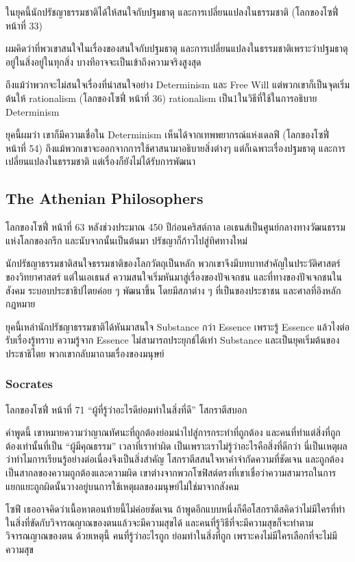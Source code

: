 ในยุคนี้นักปรัชญาธรรมชาติได้ให้สนใจกับปฐมธาตุ และการเปลี่ยนแปลงในธรรมชาติ (โลกของโซฟี่ หน้าที่ 33)

ผมคิดว่าที่พวเขาสนใจในเรื่องของสนใจกับปฐมธาตุ และการเปลี่ยนแปลงในธรรมชาติเพราะว่าปฐมธาตุอยู่ในสิ่งอยู่ในทุกสิ่ง บางทีอาจจะเป็นเข้าถึงความจริงสูงสุด

ถึงแม้ว่าพวกจะไม่สนใจเรื่องที่น่าสนใจอย่าง Determinism และ Free Will แต่พวกเขาก็เป็นจุดเริ่มต้นให้ rationalism (โลกของโซฟี่ หน้าที่ 36)
rationalism เป็น1ในวิธีที่ใช้ในการอธิบาย Determinism

ยุคนี้ผมว่า เขาก็มีความเชื่อใน Determinism เห็นได้จากเทพพยากรณ์แห่งเดลฟี (โลกของโซฟี่ หน้าที่ 54) ถึงแม้พวกเขาจะออกจากการใช้ศาสนามาอธิบายสิ่งต่างๆ
แต่ก็เฉพาะเรื่องปฐมธาตุ และการเปลี่ยนแปลงในธรรมชาติ แต่เรื่องก็ยังไม่ได้รับการพัฒนา

\subsection{The Athenian Philosophers}

\begin{bookquote}{โลกของโซฟี่ หน้าที่ 63}
หลังช่วงประมาณ 450 ปีก่อนคริสต์กาล เอเธนส์เป็นศูนย์กลางทางวัฒนธรรมแห่งโลกของกรีก และนับจากนั้นเป็นต้นมา ปรัชญาก็ก้าวไปสู่ทิศทางใหม่

นักปรัชญาธรรมชาติสนใจธรรมชาติของโลกวัตถุเป็นหลัก พวกเขาจึงมีบทบาทสำคัญในประวัติศาสตร์ของวิทยาศาสตร์ แต่ในเอเธนส์ ความสนใจเริ่มหันมาสู่เรื่องของปัจเจกชน และที่ทางของปัจเจกชนในสังคม ระบอบประชาธิปไตยค่อย ๆ พัฒนาขึ้น โดยมีสภาต่าง ๆ ที่เป็นของประชาชน และศาลที่อิงหลักกฎหมาย
\end{bookquote}

ยุคนี้เหล่านักปรัชญาธรรมชาติได้หันมาสนใจ Substance กว่า Essence เพราะรู้ Essence แล้วไงต่อ รับเรื่องรู้ทราบ ความรู้จาก Essence ไม่สามารถประยุกธ์ได้เท่า Substance
และเป็นยุคเริ่มต้นของประชาธิไตย พวกเขากลับมาถามเรื่องของมนุษย์

\subsubsection{Socrates}

\begin{bookquote}{โลกของโซฟี่ หน้าที่ 71}
“ผู้ที่รู้ว่าอะไรดีย่อมทำในสิ่งที่ดี” โสกราตีสบอก

คำพูดนี้ เขาหมายความว่าญาณทัศนะที่ถูกต้องย่อมนำไปสู่การกระทำที่ถูกต้อง และคนที่ทำแต่สิ่งที่ถูกต้องเท่านั้นที่เป็น “ผู้มีคุณธรรม” เวลาที่เราทำผิด เป็นเพราะเราไม่รู้ว่าอะไรคือสิ่งที่ดีกว่า นี่เป็นเหตุผลว่าทำไมการเรียนรู้อย่างต่อเนื่องจึงเป็นสิ่งสำคัญ โสกราตีสสนใจหาคำจำกัดความที่ชัดเจน และถูกต้องเป็นสากลของความถูกต้องและความผิด เขาต่างจากพวกโซฟิสต์ตรงที่เขาเชื่อว่าความสามารถในการแยกแยะถูกผิดนั้นวางอยู่บนการใช้เหตุผลของมนุษย์ไม่ใช่มาจากสังคม

โซฟี เธออาจคิดว่าเนื้อหาตอนท้ายนี้ไม่ค่อยชัดเจน ถ้าพูดอีกแบบหนึ่งก็คือโสกราตีสคิดว่าไม่มีใครที่ทำในสิ่งที่ขัดกับวิจารณญาณของตนแล้วจะมีความสุขได้ และคนที่รู้วิธีที่จะมีความสุขก็จะทำตามวิจารณญาณของตน ด้วยเหตุนี้ คนที่รู้ว่าอะไรถูก ย่อมทำในสิ่งที่ถูก เพราะคงไม่มีใครเลือกที่จะไม่มีความสุข
\end{bookquote}

